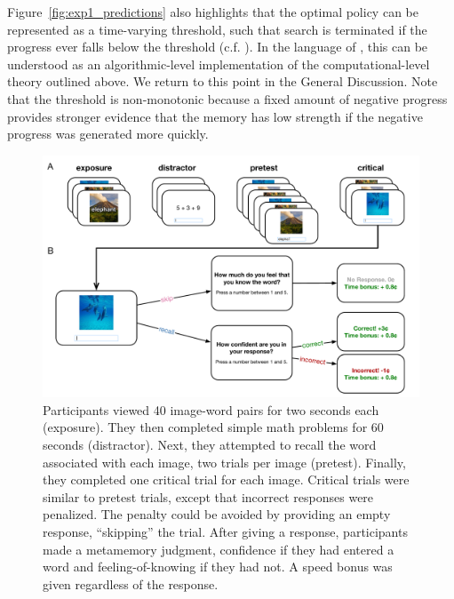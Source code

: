 Figure~\ref{fig:exp1_predictions} also highlights that the optimal policy can be represented as a time-varying threshold, such that search is terminated if the progress ever falls below the threshold (c.f. \citealp{drugowitsch2012cost}). In the language of \citet{marr1982vision}, this can be understood as an algorithmic-level implementation of the computational-level theory outlined above. We return to this point in the General Discussion. Note that the threshold is non-monotonic because a fixed amount of negative progress provides stronger evidence that the memory has low strength if the negative progress was generated more quickly.




\begin{figure}[htb!]
  \centering
  \includegraphics[width=\textwidth]{figs/memory/task_exp1.pdf}
  \caption{ 
     Participants viewed 40 image-word pairs for two seconds each (exposure). They then completed simple math problems for 60 seconds (distractor). Next, they attempted to recall the word associated with each image, two trials per image (pretest). Finally, they completed one critical trial for each image.
     Critical trials were similar to pretest trials, except that incorrect responses were penalized. The penalty could be avoided by providing an empty response, ``skipping'' the trial. After giving a response, participants made a metamemory judgment, confidence if they had entered a word and feeling-of-knowing if they had not. A speed bonus was given regardless of the response.}
  \label{fig:task-exp1}
\end{figure}

